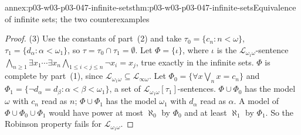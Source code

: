 \begin{annexitem}{annex:p03-w03-p03-047-infinite-sets}{thm:p03-w03-p03-047-infinite-sets}{Equivalence of infinite sets; the two counterexamples}
\begin{proof}
(3) Use the constants of part~(2) and take \(\tau_0=\{c_n:n<\omega\}\),
\(\tau_1=\{d_\alpha:\alpha<\omega_1\}\), so \(\tau=\tau_0\cap\tau_1=\emptyset\).
Let \(\Phi=\{\iota\}\), where \(\iota\) is the
\(\mathscr L_{\omega_1\omega}\)-sentence
\(\bigwedge_{n\ge1}\exists x_1\cdots\exists x_n\bigwedge_{1\le i<j\le n}\neg x_i=x_j\),
true exactly in the infinite sets.  \(\Phi\) is complete by part~(1),
since \(\mathscr L_{\omega_1\omega}\subseteq\mathscr L_{\infty\omega}\).
Let \(\Phi_0=\{\forall x\bigvee_nx=c_n\}\) and
\(\Phi_1=\{\neg d_\alpha=d_\beta:\alpha<\beta<\omega_1\}\), a set of
\(\mathscr L_{\omega_1\omega}[\tau_1]\)-sentences.  \(\Phi\cup\Phi_0\) has
the model \(\omega\) with \(c_n\) read as \(n\); \(\Phi\cup\Phi_1\) has the
model \(\omega_1\) with \(d_\alpha\) read as \(\alpha\).  A model of
\(\Phi\cup\Phi_0\cup\Phi_1\) would have power at most \(\aleph_0\) by
\(\Phi_0\) and at least \(\aleph_1\) by \(\Phi_1\).  So the Robinson
property fails for \(\mathscr L_{\omega_1\omega}\).
\end{proof}
\end{annexitem}
